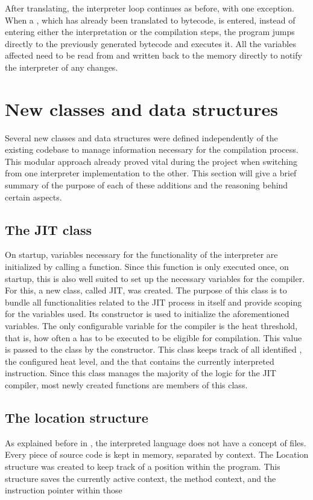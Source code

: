 After translating, the interpreter loop continues as before, with one exception. When a \bb{}, which has already been translated to bytecode, is entered, instead of entering either the interpretation or the compilation steps, the program jumps directly to the previously generated bytecode and executes it. All the variables affected need to be read from and written back to the memory directly to notify the interpreter of any changes.

\section{New classes and data structures}
Several new classes and data structures were defined independently of the existing codebase to manage information necessary for the compilation process. This modular approach already proved vital during the project when switching from one interpreter implementation to the other. This section will give a brief summary of the purpose of each of these additions and the reasoning behind certain aspects.

\subsection{The JIT class}
On startup, variables necessary for the functionality of the interpreter are initialized by calling a function. Since this function is only executed once, on startup, this is also well suited to set up the necessary variables for the \jit{} compiler. 
For this, a new class, called JIT, was created. The purpose of this class is to bundle all functionalities related to the JIT process in itself and provide scoping for the variables used. Its constructor is used to initialize the aforementioned variables. The only configurable variable for the \jit{} compiler is the heat threshold, that is, how often a \bb{} has to be executed to be eligible for compilation. This value is passed to the class by the constructor.
This class keeps track of all identified \bbs{}, the configured heat level, and the \bb{} that contains the currently interpreted instruction.
Since this class manages the majority of the logic for the JIT compiler, most newly created functions are members of this class. 

\subsection{The location structure}
As explained before in , the interpreted language does not have a concept of files. Every piece of source code is kept in memory, separated by context. 
The Location structure was created to keep track of a position within the program. This structure saves the currently active context, the method context, and the instruction pointer within those

